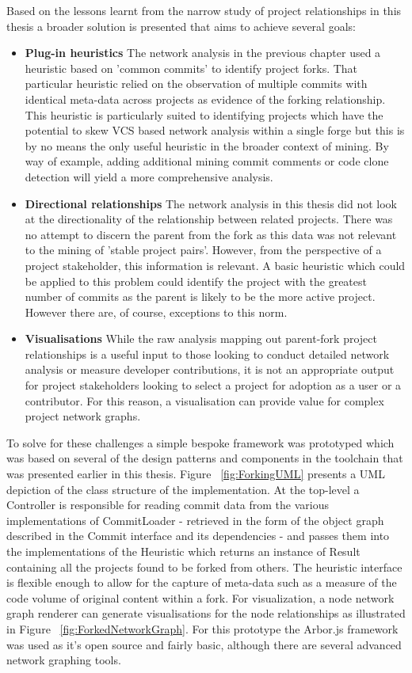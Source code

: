 Based on the lessons learnt from the narrow study of project relationships in this thesis a broader solution is presented that aims to achieve several goals:

\begin{itemize}
\item  \textbf{Plug-in heuristics} The network analysis in the previous chapter used a heuristic based on 'common commits' to identify project forks. That particular heuristic relied on the observation of multiple commits with identical meta-data across projects as evidence of the forking relationship. This heuristic is particularly suited to identifying projects which have the potential to skew VCS based network analysis within a single forge but this is by no means the only useful heuristic in the broader context of mining. By way of example, adding additional mining commit comments or code clone detection will yield a more comprehensive analysis.
\item  \textbf{Directional relationships} The network analysis in this thesis did not look at the directionality of the relationship between related projects. There was no attempt to discern the parent from the fork as this data was not relevant to the mining of 'stable project pairs'. However, from the perspective of a project stakeholder, this information is relevant. A basic heuristic which could be applied to this problem could identify the project with the greatest number of commits as the parent is likely to be the more active project. However there are, of course, exceptions to this norm.
\item  \textbf{Visualisations} While the raw analysis mapping out parent-fork project relationships is a useful input to those looking to conduct detailed network analysis or measure developer contributions, it is not an appropriate output for project stakeholders looking to select a project for adoption as a user or a contributor. For this reason, a visualisation can provide value for complex project network graphs.
\end{itemize}

To solve for these challenges a simple bespoke framework was prototyped which was based on several of the design patterns and components in the toolchain that was presented earlier in this thesis. Figure ~\ref{fig:ForkingUML} presents a UML depiction of the class structure of the implementation. At the top-level a Controller is responsible for reading commit data from the various implementations of CommitLoader - retrieved in the form of the object graph described in the Commit interface and its dependencies - and passes them into the implementations of the Heuristic which returns an instance of Result containing all the projects found to be forked from others. The heuristic interface is flexible enough to allow for the capture of meta-data such as a measure of the code volume of original content within a fork. For visualization, a node network graph renderer can generate visualisations for the node relationships as illustrated in Figure ~\ref{fig:ForkedNetworkGraph}. For this prototype the Arbor.js framework was used as it's open source and fairly basic, although there are several advanced network graphing tools.

